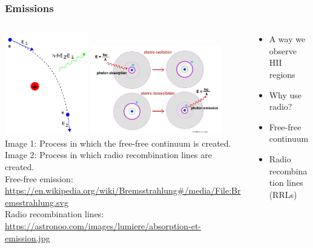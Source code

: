 \documentclass[aspectratio=169,compress]{beamer}
\newcommand\teeny{\fontsize{3pt}{3.6pt}\selectfont}
\begin{document}
\begin{frame}
  \frametitle{Emissions}
  \begin{columns}
    \begin{column}{0.5\textwidth}
      \includegraphics[width=0.35\textwidth]{figures/bremms.png}
      \includegraphics[width=0.55\textwidth]{figures/rrl.jpg}\\
      {\teeny Image 1: Process in which the free-free continuum is created.}
      {\teeny\\ Image 2: Process in which radio recombination lines are created.}
      {\teeny\\ Free-free emission: \url{https://en.wikipedia.org/wiki/Bremsstrahlung\#/media/File:Bremsstrahlung.svg}}
      {\teeny\\ Radio recombination lines: \url{https://astronoo.com/images/lumiere/absorption-et-emission.jpg}}
    \end{column}
    \begin{column}{0.5\textwidth}
      \begin{itemize}
        \item A way we observe HII regions
        \item Why use radio?
        \item Free-free continuum
        \item Radio recombination lines (RRLs)
      \end{itemize}
    \end{column}
  \end{columns}
\end{frame}
\end{document}
